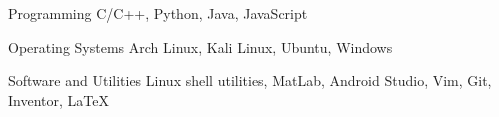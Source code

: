 
\begin{cvskills}

  \cvskill
    {Programming} %
    {C/C++, Python, Java, JavaScript} %

  \cvskill
    {Operating Systems} %
    {Arch Linux, Kali Linux, Ubuntu, Windows} %

  \cvskill
    {Software and Utilities} %
    {Linux shell utilities, MatLab, Android Studio, Vim, Git, Inventor, \LaTeX} %

\end{cvskills}
